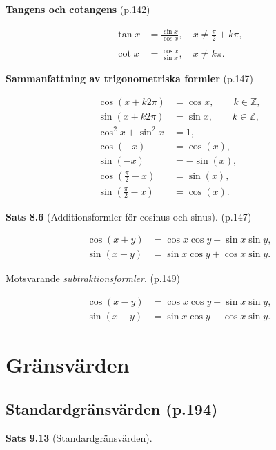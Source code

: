 \documentclass[11pt]{article}
\begin{document}
\textbf{Tangens och cotangens} (p.142)

\begin{align}
    \tan x &= \frac{\sin x}{\cos x}, \quad x \neq \frac{\pi}{2} + k\pi,\\
    \nonumber \\
    \cot x &= \frac{\cos x}{\sin x}, \quad x \neq k\pi.
\end{align}

\textbf{Sammanfattning av trigonometriska formler} (p.147)

\begin{align}
    \cos(x + k2\pi) &= \cos x, \qquad k \in \mathbb{Z},\\
    \sin(x + k2\pi) &= \sin x, \qquad k \in \mathbb{Z},\\
    \cos^2 x + \sin^2 x &= 1,\\
    \cos(-x) &= \cos(x),\\
    \sin(-x) &= -\sin(x),\\
    \cos\left(\frac{\pi}{2} - x\right) &= \sin(x),\\
    \sin\left(\frac{\pi}{2} - x\right) &= \cos(x).
\end{align}

\textbf{Sats 8.6} (Additionsformler för cosinus och sinus). (p.147)

\begin{align}
    \cos(x + y) &= \cos x \cos y - \sin x \sin y,\\
    \sin(x + y) &= \sin x \cos y + \cos x \sin y.
\end{align}

Motsvarande \textit{subtraktionsformler}. (p.149)

\begin{align}
    \cos(x - y) &= \cos x \cos y + \sin x \sin y,\\
    \sin(x - y) &= \sin x \cos y - \cos x \sin y.
\end{align}

\section{Gränsvärden}

\subsection{Standardgränsvärden (p.194)}

\textbf{Sats 9.13} (Standardgränsvärden).
\end{document}
